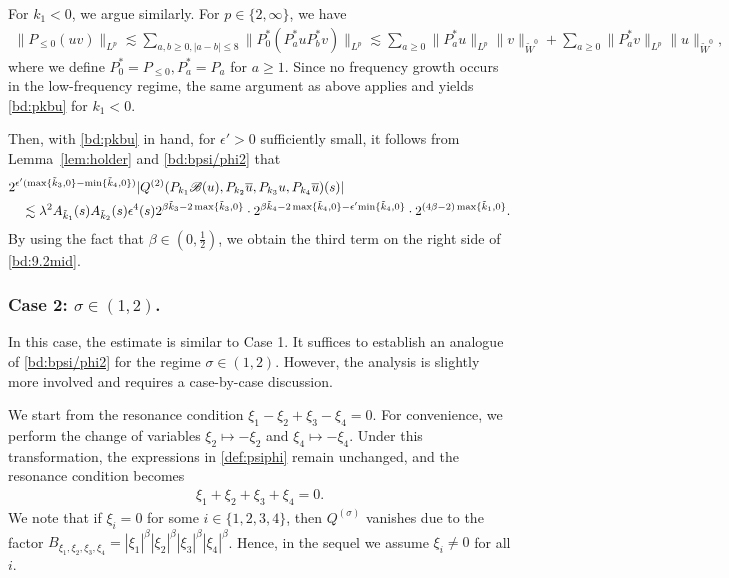 \documentclass[UTF-8,reqno]{amsart}
\numberwithin{equation}{section}
\theoremstyle{definition}
\def\min{{\mathord{{\rm min}}}}
\def\geq{\geqslant}
\def\leq{\leqslant}
\def\min{{\mathord{{\rm min}}}}
\def\geq{\geqslant}
\def\leq{\leqslant}
\begin{document}
For $k_1<0$, we argue similarly. For $p\in\{2,\infty\}$, we have
\begin{align*}
  \|  P_{\leq 0}(uv)\|_{L^p}\lesssim \sum_{a,b\geq0,|a-b|\leq 8}\|P_0^*(P_a^*uP_b^*v)\|_{L^p}\lesssim \sum_{a \geq0}\|P_a^*u\|_{L^p}\|v\|_{\widetilde{W}^0}+\sum_{a \geq0}\|P_a^*v\|_{L^p}\|u\|_{\widetilde{W}^0},
\end{align*}
where we define $P_0^*=P_{\leq 0},P_a^*=P_a$ for $a\geq1$. Since no frequency growth occurs in the low-frequency regime, 
the same argument as above applies and yields \eqref{bd:pkbu} for $k_1<0$.



 Then, with \eqref{bd:pkbu} in hand, for $\epsilon'>0$ sufficiently small, it follows from Lemma~\ref{lem:holder} and \eqref{bd:bpsi/phi2} that
 \begin{align*}
    & 2^{\epsilon'(\max\{\tilde k_3,0\}-\min\{\tilde k_4,0\})}|  Q^{(2)}  (P_{k_1}\mathscr{B}(u),P_{k_2}\overline u,P_{k_3}u,P_{k_4}\overline u)(s)|\\
     &\quad\lesssim \lambda^2 A_{\tilde k_1}(s)A_{\tilde k_2}(s)\epsilon^4(s)2^{\beta \tilde{k}_3-2\max\{\tilde{k}_3,0\}}\cdot 2^{\beta \tilde{k}_4-2\max\{\tilde{k}_4,0\}-\epsilon' \min\{\tilde k_4,0\}}\cdot   2^{(4\beta-2)\max\{\tilde{k}_1,0\}}.
 \end{align*}
    By using the fact that $\beta\in(0,\frac12)$, we obtain the third term on the right side of \eqref{bd:9.2mid}.




 \subsubsection{Case 2: $\sigma\in(1,2)$.}
 In this case, the estimate is similar to Case 1. It suffices to establish an analogue of \eqref{bd:bpsi/phi2} 
for the regime $\sigma \in (1,2)$. 
However, the analysis is slightly more involved and requires a case-by-case discussion.

We start from the resonance condition
$\xi_1 - \xi_2 + \xi_3 - \xi_4 = 0.$
For convenience, we perform the change of variables 
$\xi_2 \mapsto -\xi_2$ and $\xi_4 \mapsto -\xi_4$. 
Under this transformation, the expressions in \eqref{def:psiphi} remain unchanged, 
and the resonance condition becomes
\begin{align*}
\xi_1 + \xi_2 + \xi_3 + \xi_4 = 0.
\end{align*}
We note that if $\xi_i = 0$ for some $i \in \{1,2,3,4\}$, 
then $Q^{(\sigma)}$ vanishes due to the factor 
$B_{\xi_1,\xi_2,\xi_3,\xi_4} = |\xi_1|^\beta|\xi_2|^\beta|\xi_3|^\beta|\xi_4|^\beta$. 
Hence, in the sequel we assume $\xi_i \neq 0$ for all $i$.
\end{document}
